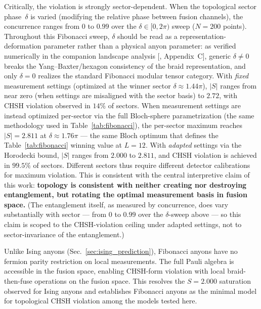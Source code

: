 \documentclass[aps,pra,twocolumn,superscriptaddress,showpacs,floatfix]{revtex4-2}
\begin{document}
Critically, the violation is strongly sector-dependent. When the topological
sector phase~$\delta$ is varied (modifying the relative phase between fusion
channels), the concurrence ranges from $0$ to $0.99$ over the
$\delta\in[0,2\pi)$ sweep ($N=200$ points). Throughout this Fibonacci sweep,
$\delta$ should be read as a representation-deformation parameter rather than
a physical anyon parameter: as verified numerically in the companion landscape
analysis [\cite{Sayim2026fibonacci}, Appendix~C], generic $\delta\neq0$ breaks
the Yang--Baxter/hexagon consistency of the braid representation, and only
$\delta=0$ realizes the standard Fibonacci modular tensor category. With \emph{fixed} measurement
settings (optimized at the winner sector $\delta\approx 1.44\pi$), $|S|$ ranges
from near zero (when settings are misaligned with the sector basis) to
$2.72$, with CHSH violation observed in $14\%$ of sectors.
When measurement settings are instead optimized per-sector via the full
Bloch-sphere parametrization (the same methodology used in
Table~\ref{tab:fibonacci}), the per-sector maximum reaches $|S|=2.811$
at $\delta\approx 1.76\pi$ --- the same Bloch optimum that defines the
Table~\ref{tab:fibonacci} winning value at $L=12$.
With \emph{adapted}
settings via the Horodecki bound, $|S|$ ranges from $2.000$ to $2.811$, and
CHSH violation is achieved in $99.5\%$ of sectors. Different sectors thus
require different detector calibrations for maximum violation. This is
consistent with the central interpretive claim of this work: \textbf{topology
is consistent with neither creating nor destroying entanglement, but rotating
the optimal measurement basis in fusion space.} (The entanglement itself, as
measured by concurrence, does vary substantially with sector --- from $0$ to
$0.99$ over the $\delta$-sweep above --- so this claim is scoped to the
CHSH-violation ceiling under adapted settings, not to sector-invariance of the
entanglement.)

Unlike Ising anyons (Sec.~\ref{sec:ising_prediction}), Fibonacci anyons have no
fermion parity restriction on local measurements. The full Pauli algebra is
accessible in the fusion space, enabling CHSH-form violation with local
braid-then-fuse operations on the fusion space. This resolves the $S = 2.000$ saturation
observed for Ising anyons and establishes Fibonacci anyons as the minimal model
for topological CHSH violation among the models tested here.
\end{document}
